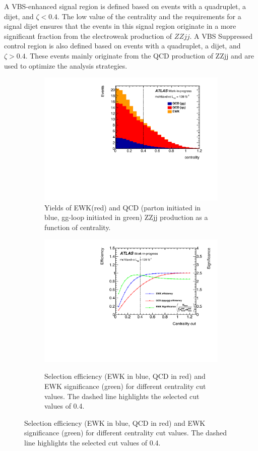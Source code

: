 A VBS-enhanced signal region is defined based on events with a quadruplet, a dijet, and $\zeta<0.4$. The low value of the centrality and the requirements for a signal dijet ensures that the events in this signal region originate in a more significant fraction from the electroweak production of $ZZjj$. A VBS Suppressed control region is also defined based on events with a quadruplet, a dijet, and $\zeta>0.4$. These events mainly originate from the QCD production of ZZjj and are used to optimize the analysis strategies.

\begin{figure}[ht]
\begin{subfigure}{.48\textwidth}
  \centering
  \includegraphics[width=.8\linewidth]{figures/AnalysisOverview/centrality_Dist.pdf}  
  \caption{Yields of EWK(red) and QCD (parton initiated in blue, gg-loop initiated in green) ZZjj production as a function of centrality.}
  \label{fig:centrality_a}
\end{subfigure}
\begin{subfigure}{.48\textwidth}
  \centering
  \includegraphics[width=.8\linewidth]{figures/AnalysisOverview/centrality_Cut.pdf}  \\
  \caption{Selection efficiency (EWK in blue, QCD in red) and EWK significance (green) for different centrality cut values. The dashed line highlights the selected cut values of 0.4.}
  \label{fig:centrality_b}
\end{subfigure}

\end{figure}
